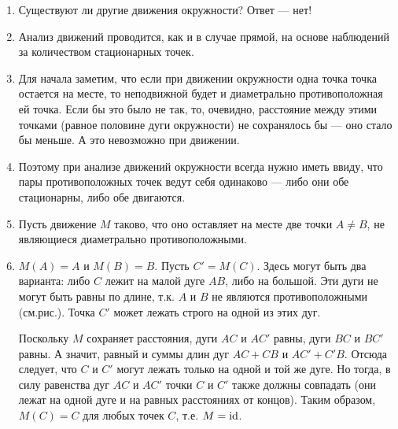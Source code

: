 \begin{enumerate}
\item Существуют ли другие движения окружности? Ответ --- нет!
\item Анализ движений проводится, как и в случае прямой, на основе наблюдений за количеством стационарных точек.
\item Для начала заметим, что если при движении окружности одна точка точка остается на месте, то неподвижной будет и диаметрально противоположная ей точка. Если бы это было не так, то, очевидно, расстояние между этими точками (равное половине дуги окружности) не сохранялось бы --- оно стало бы меньше. А это невозможно при движении.
\item Поэтому при анализе движений окружности всегда нужно иметь ввиду, что пары противоположных точек ведут себя одинаково --- либо они обе стационарны, либо обе двигаются.
\item Пусть движение $M$ таково, что оно оставляет на месте две точки $A\ne B$, не являющиеся диаметрально противоположными.
\item $M(A)=A$ и $M(B)=B$. Пусть $C'=M(C)$. Здесь могут быть два варианта: либо $C$ лежит на малой дуге $AB$, либо на большой. Эти дуги не могут быть равны по длине, т.к. $A$ и $B$ не являются противоположными (см.рис.). Точка $C'$ может лежать строго на одной из этих дуг.

Поскольку $M$ сохраняет расстояния, дуги $AC$ и $AC'$ равны, дуги $BC$ и $BC'$ равны. А значит, равный и суммы длин дуг $AC+CB$ и $AC'+C'B$. Отсюда следует, что $C$ и $C'$ могут лежать только на одной и той же дуге. Но тогда, в силу равенства дуг $AC$ и $AC'$ точки $C$ и $C'$ также должны совпадать (они лежат на одной дуге и на равных расстояниях от концов). Таким образом, $M(C)=C$ для любых точек $C$, т.е. $M=\mathrm{id}$.


\end{enumerate}
